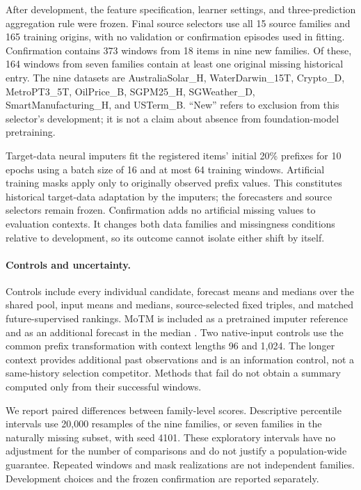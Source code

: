 \documentclass{article}
\begin{document}
After development, the feature specification, learner settings, and three-prediction aggregation rule were frozen. Final source selectors use all 15 source families and 165 training origins, with no validation or confirmation episodes used in fitting. Confirmation contains 373 windows from 18 items in nine new families. Of these, 164 windows from seven families contain at least one original missing historical entry. The nine datasets are AustraliaSolar\_H, WaterDarwin\_15T, Crypto\_D, MetroPT3\_5T, OilPrice\_B, SGPM25\_H, SGWeather\_D, SmartManufacturing\_H, and USTerm\_B. ``New'' refers to exclusion from this selector's development; it is not a claim about absence from foundation-model pretraining.

Target-data neural imputers fit the registered items' initial 20\% prefixes for 10 epochs using a batch size of 16 and at most 64 training windows. Artificial training masks apply only to originally observed prefix values. This constitutes historical target-data adaptation by the imputers; the forecasters and source selectors remain frozen. Confirmation adds no artificial missing values to evaluation contexts. It changes both data families and missingness conditions relative to development, so its outcome cannot isolate either shift by itself.

\paragraph{Controls and uncertainty.}
Controls include every individual candidate, forecast means and medians over the shared pool, input means and medians, source-selected fixed triples, and matched future-supervised rankings. MoTM is included as a pretrained imputer reference and as an additional forecast in the median \citep{motmsoftware}. Two native-input controls use the common prefix transformation with context lengths 96 and 1,024. The longer context provides additional past observations and is an information control, not a same-history selection competitor. Methods that fail do not obtain a summary computed only from their successful windows.

We report paired differences between family-level scores. Descriptive percentile intervals use 20,000 resamples of the nine families, or seven families in the naturally missing subset, with seed 4101. These exploratory intervals have no adjustment for the number of comparisons and do not justify a population-wide guarantee. Repeated windows and mask realizations are not independent families. Development choices and the frozen confirmation are reported separately.
\end{document}

